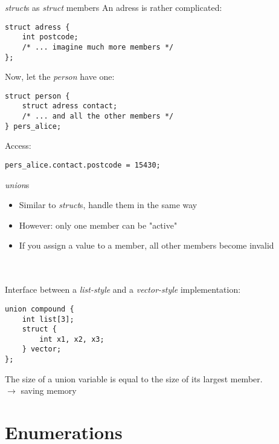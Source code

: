 \begin{frame}[fragile]{\textit{struct}s as \textit{struct} members}
	An adress is rather complicated:
	\begin{lstlisting}[numbers=none]
struct adress {
	int postcode;
	/* ... imagine much more members */
};
\end{lstlisting}
	Now, let the \textit{person} have one:
	\begin{lstlisting}[numbers=none]
struct person {
	struct adress contact;
	/* ... and all the other members */
} pers_alice;
\end{lstlisting}
	Access:
\begin{lstlisting}[numbers=none]
pers_alice.contact.postcode = 15430;
\end{lstlisting}
\end{frame}
\begin{frame}[fragile]{\textit{union}s}
	\begin{itemize}
		\item Similar to \textit{struct}s, handle them in the same way
		\item However: only one member can be "active"
		\item If you assign a value to a member, all other members become invalid
	\end{itemize} \ \\ \ \\
	Interface between a \textit{list-style} and a \textit{vector-style} implementation:
	\begin{lstlisting}[numbers=none]
union compound {
	int list[3];
	struct {
		int x1, x2, x3;
	} vector;
};
\end{lstlisting}
	The size of a union variable is equal to the size of its largest member.\\
	$\rightarrow$ saving memory
\end{frame}
\section{Enumerations}
